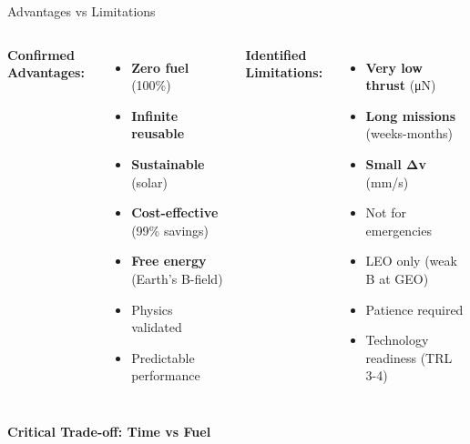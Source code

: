 \documentclass[aspectratio=169]{beamer}
\begin{document}
\begin{frame}{Advantages vs Limitations}
\begin{columns}
\textbf{Confirmed Advantages:}
\begin{itemize}
    \item[\textcolor{green}{\checkmark}] \textbf{Zero fuel} (100\%)
    \item[\textcolor{green}{\checkmark}] \textbf{Infinite reusable}
    \item[\textcolor{green}{\checkmark}] \textbf{Sustainable} (solar)
    \item[\textcolor{green}{\checkmark}] \textbf{Cost-effective} (99\% savings)
    \item[\textcolor{green}{\checkmark}] \textbf{Free energy} (Earth's B-field)
    \item[\textcolor{green}{\checkmark}] Physics validated
    \item[\textcolor{green}{\checkmark}] Predictable performance
\end{itemize}

\textbf{Identified Limitations:}
\begin{itemize}
    \item[\textcolor{red}{×}] \textbf{Very low thrust} (μN)
    \item[\textcolor{red}{×}] \textbf{Long missions} (weeks-months)
    \item[\textcolor{red}{×}] \textbf{Small Δv} (mm/s)
    \item[\textcolor{red}{×}] Not for emergencies
    \item[\textcolor{red}{×}] LEO only (weak B at GEO)
    \item[\textcolor{red}{×}] Patience required
    \item[\textcolor{red}{×}] Technology readiness (TRL 3-4)
\end{itemize}
\end{columns}

\vspace{1em}
\begin{center}
\textbf{Critical Trade-off: Time vs Fuel}
\end{center}
\end{frame}
\end{document}
